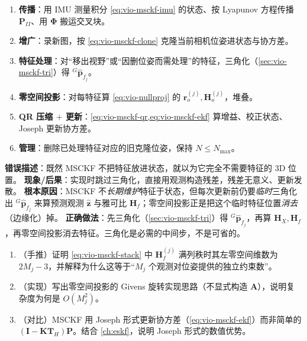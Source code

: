 \begin{algo}\label{alg:vio-msckf}
\begin{enumerate}
  \item \textbf{传播}：用 IMU 测量积分 \cref{eq:vio-msckf-imu} 的状态、按 Lyapunov 方程传播 $\mathbf{P}_{II}$、用 $\boldsymbol{\Phi}$ 搬运交叉块。
  \item \textbf{增广}：录新图，按 \cref{eq:vio-msckf-clone} 克隆当前相机位姿进状态与协方差。
  \item \textbf{特征处理}：对“移出视野”或“因删位姿而需处理”的特征，三角化（\cref{sec:vio-msckf-tri}）得 ${}^G\hat{\mathbf{p}}_{f_j}$。
  \item \textbf{零空间投影}：对每特征算 \cref{eq:vio-nullproj} 的 $\mathbf{r}_o^{(j)},\mathbf{H}_o^{(j)}$，堆叠。
  \item \textbf{QR 压缩 $+$ 更新}：\cref{eq:vio-msckf-qr,eq:vio-msckf-ekf} 算增益、校正状态、Joseph 更新协方差。
  \item \textbf{管理}：删除已处理特征对应的旧克隆位姿，保持 $N\le N_{\max}$。
\end{enumerate}
\end{algo}

\begin{pitfall}
\textbf{错误描述}：既然 MSCKF 不把特征放进状态，就以为它完全不需要特征的 $3$D 位置。
\textbf{现象/后果}：实现时跳过三角化，直接用观测构造残差，残差无意义、更新发散。
\textbf{根本原因}：MSCKF 不\emph{长期维护}特征于状态，但每次更新前仍要\emph{临时}三角化出 ${}^G\hat{\mathbf{p}}_{f_j}$ 来算预测观测 $\hat{\mathbf{z}}$ 与雅可比 $\mathbf{H}_f$；零空间投影正是把这个临时特征位置\emph{消去}（边缘化）掉。
\textbf{正确做法}：先三角化（\cref{sec:vio-msckf-tri}）得 ${}^G\hat{\mathbf{p}}_{f_j}$，再算 $\mathbf{H}_X,\mathbf{H}_f$，再零空间投影消去特征。三角化是必需的中间步，不是可省的。
\end{pitfall}

\begin{practice}
\begin{enumerate}
  \item （手推）证明 \cref{eq:vio-msckf-stack} 中 $\mathbf{H}_f^{(j)}$ 满列秩时其左零空间维数为 $2M_j-3$，并解释为什么这等于“$M_j$ 个观测对位姿提供的独立约束数”。
  \item （实现）写出零空间投影的 Givens 旋转实现思路（不显式构造 $\mathbf{A}$），说明复杂度为何是 $O(M_j^2)$。
  \item （对比）MSCKF 用 Joseph 形式更新协方差（\cref{eq:vio-msckf-ekf}）而非简单的 $(\mathbf{I}-\mathbf{K}\mathbf{T}_H)\mathbf{P}$。结合 \cref{ch:eskf}，说明 Joseph 形式的数值优势。
\end{enumerate}
\end{practice}


